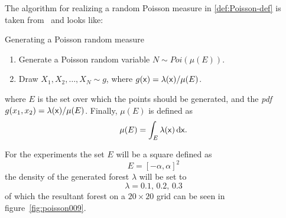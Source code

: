 The algorithm for realizing a random Poisson measure in \cref{def:Poisson-def}
is taken from~\cite[Definition~1.1.1][34]{Kroese_2014} and looks like:

\begin{definition}{Generating a Poisson random measure}
  \label{def:Poisson-def}
  \begin{enumerate}
  \item Generate a Poisson random variable \(N \sim Poi(\mu(E))\).
  \item Draw \(X_1,X_2,\ldots,X_N \sim g\), where \(g({\mathbf{\mathsf{x}}}) = \lambda({\mathbf{\mathsf{x}}})/ \mu(E)\).
  \end{enumerate}
\end{definition}
where \(E\) is the set over which the points should be generated, and the
\textit{pdf} \(g(x_1, x_2) = \lambda({\mathbf{\mathsf{x}}})/\mu(E)\). Finally, \(\mu(E)\) is
defined as
\[
  \mu(E) = \int_{E} \lambda({\mathbf{\mathsf{x}}})\, \mathrm{d} {\mathbf{\mathsf{x}}}.
\]

For the experiments the set \(E\) will be a square defined as
\[
  E = {[-\alpha, \alpha]}^2
\]
the density of the generated forest \(\lambda\) will be set to
\[
  \lambda = 0.1,\, 0.2,\, 0.3
\]
of which the resultant forest on a \(20 \times 20\) grid can be seen in
figure~\cref{fig:poisson009}.

